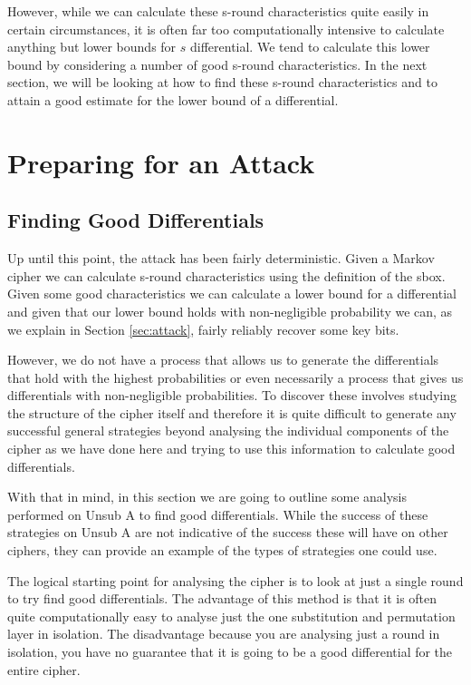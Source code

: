 \documentclass[12pt,a4paper]{article}
\begin{document}
However, while we can calculate these s-round characteristics quite easily in
certain circumstances, it is often far too computationally intensive to
calculate anything but lower bounds for $s$ differential. We tend to calculate
this lower bound by considering a number of good s-round characteristics. In
the next section, we will be looking at how to find these s-round
characteristics and to attain a good estimate for the lower bound of a
differential.

\newpage
\section{Preparing for an Attack}
\label{sec:prepare}

\subsection{Finding Good Differentials}

Up until this point, the attack has been fairly deterministic. Given a Markov
cipher we can calculate s-round characteristics using the definition of the
sbox. Given some good characteristics we can calculate a lower bound for a
differential and given that our lower bound holds with non-negligible probability
we can, as we explain in Section \ref{sec:attack}, fairly reliably recover some key bits.

However, we do not have a process that allows us to generate the differentials
that hold with the highest probabilities or even necessarily a process that gives us
differentials with non-negligible probabilities. To discover these involves
studying the structure of the cipher itself and therefore it is quite difficult
to generate any successful general strategies beyond analysing the individual
components of the cipher as we have done here and trying to use this
information to calculate good differentials. 

With that in mind, in this section we are going to outline some analysis
performed on Unsub A to find good differentials. While the success of these
strategies on Unsub A are not indicative of the success these will have on other
ciphers, they can provide an example of the types of strategies one could use.

The logical starting point for analysing the cipher is to look at just a single
round to try find good differentials. The advantage of this method is that it is
often quite computationally easy to analyse just the one substitution and
permutation layer in isolation. The disadvantage because you are analysing just
a round in isolation, you have no guarantee that it is going to be a good
differential for the entire cipher.
\end{document}
